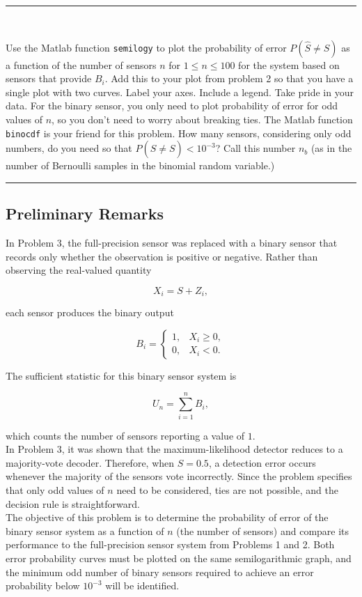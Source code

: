 \documentclass[12pt,a4paper]{article}
\begin{document}
\hrule 

\

\noindent Use the Matlab function \texttt{semilogy} to plot the probability of error $P(\hat{S} \neq S)$ as a function of the number of sensors $n$ for $1 \leq n \leq 100$ for the system based on sensors that provide $B_i$. Add this to your plot from problem 2 so that you have a single plot with two curves. Label your axes. Include a legend. Take pride in your data. For the binary sensor, you only need to plot probability of error for odd values of $n$, so you don't need to worry about breaking ties. The Matlab function \texttt{binocdf} is your friend for this problem. How many sensors, considering only odd numbers, do you need so that $P(\hat{S} \neq S) < 10^{-3}$? Call this number $n_b$ (as in the number of Bernoulli samples in the binomial random variable.)
\\

\hrule

\subsection{Preliminary Remarks}
In Problem 3, the full-precision sensor was replaced with a binary sensor that records only whether the observation is positive or negative. Rather than observing the real-valued quantity

\[
X_i=S+Z_i,
\]

each sensor produces the binary output

\[
B_i=
\begin{cases}
1, & X_i\geq 0,\\
0, & X_i<0.
\end{cases}
\]

The sufficient statistic for this binary sensor system is

\[
U_n=\sum_{i=1}^{n}B_i,
\]

which counts the number of sensors reporting a value of \(1\).\\

In Problem 3, it was shown that the maximum-likelihood detector reduces to a majority-vote decoder. Therefore, when \(S=0.5\), a detection error occurs whenever the majority of the sensors vote incorrectly. Since the problem specifies that only odd values of \(n\) need to be considered, ties are not possible, and the decision rule is straightforward.\\

The objective of this problem is to determine the probability of error of the binary sensor system as a function of $n$ (the number of sensors) and compare its performance to the full-precision sensor system from Problems 1 and 2. Both error probability curves must be plotted on the same semilogarithmic graph, and the minimum odd number of binary sensors required to achieve an error probability below \(10^{-3}\) will be identified.
\end{document}
